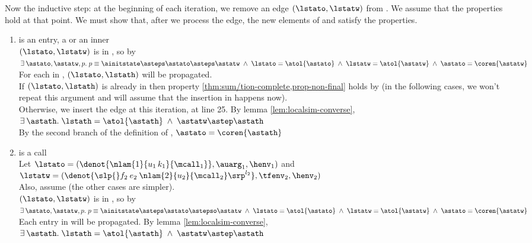 \documentclass{LMCS}
\theoremstyle{definition} \newtheorem{property}[thm]{Property}
\begin{document}
Now the inductive step: at the beginning of each iteration, we remove an edge
$(\lstato, \lstatw)$ from \work{}.
We assume that the properties hold at that point.
We must show that, after we process the edge, the new elements of \seen{} and 
\finals{} satisfy the properties.
\begin{enumerate}[$\bullet$]
\item 
  \lstatw{} is an entry, a \dlcapply{} or an inner \dlceval \\
  $(\lstato, \lstatw)$ is in \seen, so by \ih \\
  $\exists \: \astato, \astatw, p. \;
  p \equiv \ainitstate \asteps \astato \asteps \astatw 
  \;\land\; \lstato = \atol{\astato} 
  \;\land\; \lstatw = \atol{\astatw}
  \;\land\; \astato = \coren{\astatw}$ \\
  For each \lstath{} in \succ{\lstatw}, $(\lstato, \lstath)$ will be propagated.
  \\
  If $(\lstato, \lstath)$ is already in \seen{} then property 
  \ref{thm:sum/tion-complete,prop-non-final} holds by \ih{}
  (in the following cases, we won't repeat this argument and will assume that
  the insertion in \seen{} happens now).
  \\
  Otherwise, we insert the edge at this iteration, at line 25.
  By lemma \ref{lem:localsim-converse}, \\
  $\exists \: \astath. \;
  \lstath = \atol{\astath} \;\land\; \astatw \astep \astath$ \\
  By the second branch of the definition of \dcoren{},
  $\astato = \coren{\astath}$
\item
  \lstatw{} is a call \\
  Let $\lstato = (\denot{\nlam{1}{u_1 \, k_1}{\mcall_1}}, \auarg_1, \henv_1)$ 
  and $\lstatw = (\denot{\slp{}f_2 \: e_2 \: \nlam{2}{u_2}{\mcall_2}\srp^{l_2}}, 
  \tfenv_2, \henv_2)$ \\
  Also, assume  (the other cases are simpler). \\
  $(\lstato, \lstatw)$ is in \seen, so by \ih \\
  $\exists \: \astato, \astatw, p. \;
  p \equiv \ainitstate \asteps \astato \astepso \astatw 
  \;\land\; \lstato = \atol{\astato} 
  \;\land\; \lstatw = \atol{\astatw}
  \;\land\; \astato = \coren{\astatw}$ \\
  Each entry \lstath{} in \succ{\lstatw} will be propagated.
  By lemma \ref{lem:localsim-converse}, \\
  $\exists \: \astath. \;
  \lstath = \atol{\astath} \;\land\; \astatw \astep \astath$ \\

\end{enumerate}
\end{document}
